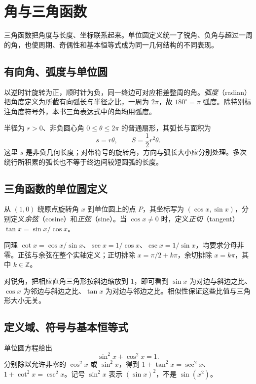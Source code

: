 \setcounter{chapter}{16} %
\chapter{角与三角函数}
\label{chap:em-trigonometry}
三角函数把角度与长度、坐标联系起来。单位圆定义统一了锐角、负角与超过一周的角，也使周期、奇偶性和基本恒等式成为同一几何结构的不同表现。

\section{有向角、弧度与单位圆}
以逆时针旋转为正，顺时针为负，同一终边可对应相差整周的角。\emph{弧度}（radian）把角度定义为所截有向弧长与半径之比，一周为 $2\pi$，故 $180^\circ=\pi$ 弧度。除特别标注角度符号外，本书三角表达式中的角均用弧度。

半径为 $r>0$、非负圆心角 $0\le\theta\le2\pi$ 的普通扇形，其弧长与面积为
\[
 s=r\theta,\qquad S=\frac12r^2\theta.
\]
这里 $s$ 是非负几何长度；对带符号的旋转角，方向与弧长大小应分别处理。多次绕行所积累的弧长也不等于终边间较短圆弧的长度。

\section{三角函数的单位圆定义}
\begin{definition}
从 $(1,0)$ 绕原点旋转角 $x$ 到单位圆上的点 $P$，其坐标写为 $(\cos x,\sin x)$，分别定义\emph{余弦}（cosine）和\emph{正弦}（sine）。当 $\cos x\ne0$ 时，定义\emph{正切}（tangent）$\tan x=\sin x/\cos x$。
\end{definition}
同理 $\cot x=\cos x/\sin x$、$\sec x=1/\cos x$、$\csc x=1/\sin x$，均要求分母非零。正弦与余弦在整个实轴定义；正切排除 $x=\pi/2+k\pi$，余切排除 $x=k\pi$，其中 $k\in\mathbb Z$。

对锐角，把相应直角三角形按斜边缩放到 $1$，即可看到 $\sin x$ 为对边与斜边之比、$\cos x$ 为邻边与斜边之比、$\tan x$ 为对边与邻边之比。相似性保证这些比值与三角形大小无关。

\section{定义域、符号与基本恒等式}
单位圆方程给出
\begin{equation}\label{eq:em-trig-pythagorean}
 \sin^2x+\cos^2x=1.
\end{equation}
分别除以允许非零的 $\cos^2x$ 或 $\sin^2x$，得到 $1+\tan^2x=\sec^2x$、$1+\cot^2x=\csc^2x$。记号 $\sin^2x$ 表示 $(\sin x)^2$，不是 $\sin(x^2)$。

